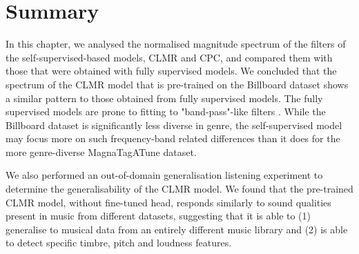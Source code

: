 \section*{Summary}
In this chapter, we analysed the normalised magnitude spectrum of the filters of the self-supervised-based models, CLMR and CPC, and compared them with those that were obtained with fully supervised models. We concluded that the spectrum of the CLMR model that is pre-trained on the Billboard dataset shows a similar pattern to those obtained from fully supervised models. The fully supervised models are prone to fitting to "band-pass"-like filters \cite{lee2018samplecnn}. While the Billboard dataset is significantly less diverse in genre, the self-supervised model may focus more on such frequency-band related differences than it does for the more genre-diverse MagnaTagATune dataset.

We also performed an out-of-domain generalisation listening experiment to determine the generalisability of the CLMR model. We found that the pre-trained CLMR model, without fine-tuned head, responds similarly to sound qualities present in music from different datasets, suggesting that it is able to (1) generalise to musical data from an entirely different music library and (2) is able to detect specific timbre, pitch and loudness features.

\newpage

